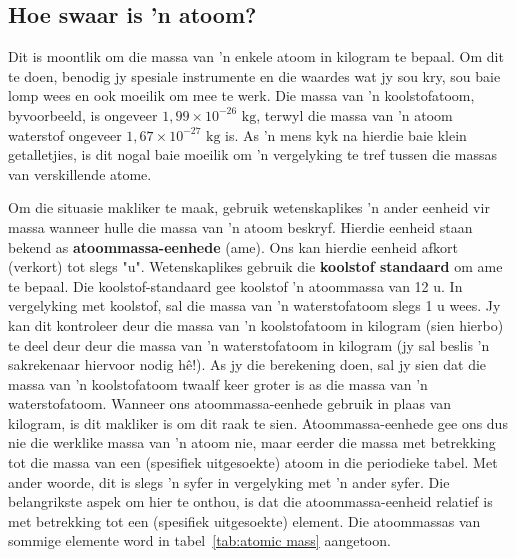             \subsection*{Hoe swaar is 'n atoom?}
            \nopagebreak
        \label{m38756*id254863}
Dit is moontlik om die massa van 'n enkele atoom in kilogram te bepaal. Om dit te doen, benodig jy spesiale instrumente en die waardes wat jy sou kry, sou baie lomp wees en ook moeilik om mee te werk. Die massa van 'n koolstofatoom, byvoorbeeld, is ongeveer  $1,99 \times {10}^{-26}\text{ kg}$, terwyl die massa van 'n atoom waterstof ongeveer $1,67 \times {10}^{-27}\text{ kg}$ is. As 'n mens kyk na hierdie baie klein getalletjies, is dit nogal baie moeilik om  'n vergelyking te tref tussen die massas van verskillende atome.\par 
        \label{m38756*id254908}
Om die situasie makliker te maak, gebruik wetenskaplikes 'n ander eenheid vir massa wanneer hulle die massa van  'n atoom beskryf. Hierdie eenheid staan bekend as \textbf{atoommassa-eenhede} (ame). Ons kan hierdie eenheid afkort (verkort) tot slegs "u". Wetenskaplikes gebruik die \textbf{koolstof standaard} om ame te bepaal. Die koolstof-standaard gee koolstof 'n atoommassa van 12 u. In vergelyking met koolstof, sal die massa van 'n waterstofatoom slegs 1 u wees. Jy kan dit kontroleer deur die massa van 'n koolstofatoom in kilogram (sien hierbo) te deel deur deur die massa van 'n waterstofatoom in kilogram (jy sal beslis  'n sakrekenaar hiervoor nodig hê!). As jy die berekening doen, sal jy sien dat die massa van 'n
koolstofatoom twaalf keer groter is as die massa van 'n waterstofatoom. Wanneer ons atoommassa-eenhede gebruik in plaas van kilogram, is dit makliker is om dit raak te sien. Atoommassa-eenhede gee ons dus nie die werklike massa van 'n atoom nie, maar eerder die massa met betrekking tot die massa van een (spesifiek uitgesoekte) atoom in die periodieke tabel. Met ander woorde, dit is slegs 'n syfer in vergelyking met 'n ander syfer. Die belangrikste aspek om hier te onthou, is dat die atoommassa-eenheid relatief is met betrekking tot een (spesifiek uitgesoekte) element. Die atoommassas van sommige elemente word in tabel~\ref{tab:atomic mass} aangetoon.
